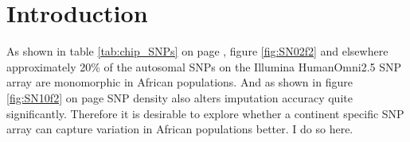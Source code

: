 \section{Introduction}
\label{sec:introduction_chip}

As shown in table \ref{tab:chip_SNPs} on page \pageref{tab:chip_SNPs}, figure \ref{fig:SN02f2} and elsewhere\cite{Gurdasani2015} approximately 20\% of the autosomal SNPs on the Illumina HumanOmni2.5 SNP array are monomorphic in African populations. And as shown in figure \ref{fig:SN10f2} on page \pageref{fig:SN10f2} \gls{SNP} density also alters imputation accuracy quite significantly. Therefore it is desirable to explore whether a continent specific \gls{SNP} array can capture variation in African populations better. I do so here.


